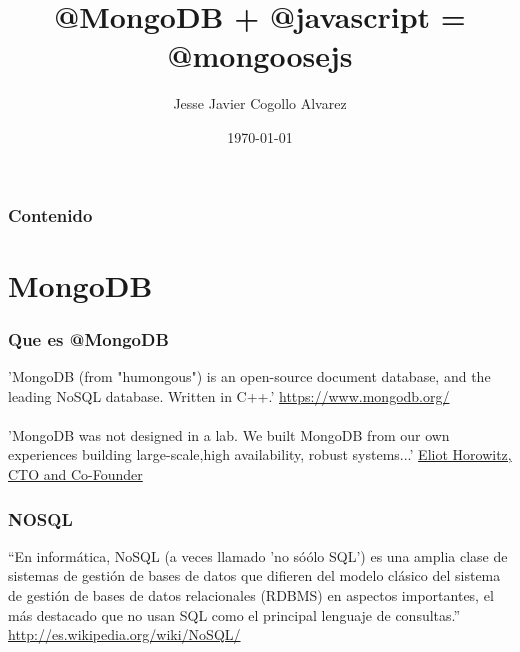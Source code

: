 \documentclass{beamer}
\title[@Mongoosejs]{@MongoDB + @javascript = @mongoosejs}
\author{Jesse Javier Cogollo Alvarez}
\institute[EAFIT]
{
Developer by passion \\
\medskip
\textit{twitter: @jessecogollo}
}
\date{\today}
\begin{document}
	\begin{frame}
		\titlepage %
	\end{frame}

	\begin{frame}
		\frametitle{Contenido}
		\tableofcontents
	\end{frame}



\section{MongoDB}
\begin{frame}
\frametitle{Que es @MongoDB}
'MongoDB (from "humongous") is an open-source document database, and the leading NoSQL database. Written in C++.'
{\color{blue}\url{https://www.mongodb.org/}}
\pause
\\~\\
'MongoDB was not designed in a lab. We built MongoDB from our own experiences building large-scale,high availability, robust systems...'
\underline{\color{green}Eliot Horowitz, CTO and Co-Founder}	
\end{frame}
\begin{frame}
\frametitle{NOSQL}
“En inform\'atica, NoSQL (a veces llamado 'no só\'olo SQL') es una amplia clase de sistemas de gesti\'on de bases de datos que difieren del modelo cl\'asico del sistema de gesti\'on de bases de datos relacionales (RDBMS) en aspectos importantes, el m\'as destacado que no usan SQL como el principal lenguaje de consultas.” {\color{blue}\url{http://es.wikipedia.org/wiki/NoSQL/}}
\\~\\
\end{frame}
\end{document}
